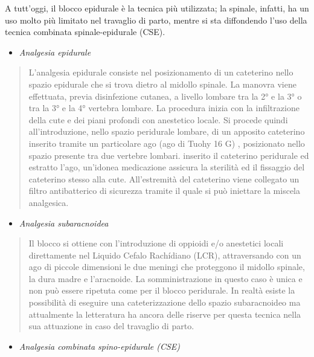 \documentclass[]{article}
\begin{document}
A tutt'oggi, il blocco epidurale è la tecnica più utilizzata; la
spinale, infatti, ha un uso molto più limitato nel travaglio di parto,
mentre si sta diffondendo l'uso della tecnica combinata
spinale-epidurale (CSE).

\begin{itemize}
\item
  \emph{Analgesia epidurale}
\end{itemize}

\begin{quote}
L'analgesia epidurale consiste nel posizionamento di un cateterino nello
spazio epidurale che si trova dietro al midollo spinale. La manovra
viene effettuata, previa disinfezione cutanea, a livello lombare tra la
2° e la 3° o tra la 3° e la 4° vertebra lombare. La procedura inizia con
la infiltrazione della cute e dei piani profondi con anestetico locale.
Si procede quindi all'introduzione, nello spazio peridurale lombare, di
un apposito cateterino inserito tramite un particolare ago (ago di Tuohy
16 G) , posizionato nello spazio presente tra due vertebre lombari.
inserito il cateterino peridurale ed estratto l'ago, un'idonea
medicazione assicura la sterilità ed il fissaggio del cateterino stesso
alla cute. All'estremità del cateterino viene collegato un filtro
antibatterico di sicurezza tramite il quale si può iniettare la miscela
analgesica.
\end{quote}

\begin{itemize}
\item
  \emph{Analgesia subaracnoidea}
\end{itemize}

\begin{quote}
Il blocco si ottiene con l'introduzione di oppioidi e/o anestetici
locali direttamente nel Liquido Cefalo Rachídiano (LCR), attraversando
con un ago di piccole dimensioni le due meningi che proteggono il
midollo spinale, la dura madre e l'aracnoide. La somministrazione in
questo caso è unica e non può essere ripetuta come per il blocco
peridurale. In realtà esiste la possibilità di eseguire una
cateterizzazione dello spazio subaracnoideo ma attualmente la
letteratura ha ancora delle riserve per questa tecnica nella sua
attuazione in caso del travaglio di parto.
\end{quote}

\begin{itemize}
\item
  \emph{Analgesia combinata spino-epidurale (CSE)}
\end{itemize}
\end{document}
